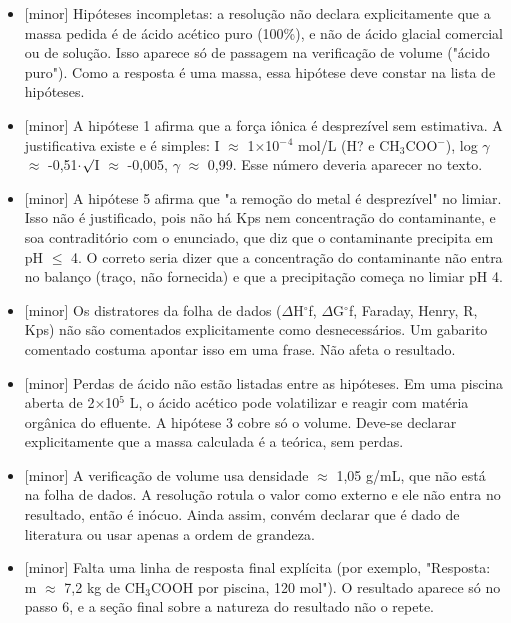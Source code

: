 \documentclass{article}%
\begin{document}
\begin{itemize}%
\item%
{[}minor{]} Hipóteses incompletas: a resolução não declara explicitamente que a massa pedida é de ácido acético puro (100\%), e não de ácido glacial comercial ou de solução. Isso aparece só de passagem na verificação de volume ("ácido puro"). Como a resposta é uma massa, essa hipótese deve constar na lista de hipóteses.%
\item%
{[}minor{]} A hipótese 1 afirma que a força iônica é desprezível sem estimativa. A justificativa existe e é simples: I $\approx$ 1$\times$10$^{-}$$^{4}$ mol/L (H? e CH$_{3}$COO$^{-}$), log $\gamma$ $\approx$ -0,51$\cdot$$\surd$I $\approx$ -0,005, $\gamma$ $\approx$ 0,99. Esse número deveria aparecer no texto.%
\item%
{[}minor{]} A hipótese 5 afirma que "a remoção do metal é desprezível" no limiar. Isso não é justificado, pois não há Kps nem concentração do contaminante, e soa contraditório com o enunciado, que diz que o contaminante precipita em pH $\leq$ 4. O correto seria dizer que a concentração do contaminante não entra no balanço (traço, não fornecida) e que a precipitação começa no limiar pH 4.%
\item%
{[}minor{]} Os distratores da folha de dados ($\Delta$H$^\circ$f, $\Delta$G$^\circ$f, Faraday, Henry, R, Kps) não são comentados explicitamente como desnecessários. Um gabarito comentado costuma apontar isso em uma frase. Não afeta o resultado.%
\item%
{[}minor{]} Perdas de ácido não estão listadas entre as hipóteses. Em uma piscina aberta de 2$\times$10$^{5}$ L, o ácido acético pode volatilizar e reagir com matéria orgânica do efluente. A hipótese 3 cobre só o volume. Deve{-}se declarar explicitamente que a massa calculada é a teórica, sem perdas.%
\item%
{[}minor{]} A verificação de volume usa densidade $\approx$ 1,05 g/mL, que não está na folha de dados. A resolução rotula o valor como externo e ele não entra no resultado, então é inócuo. Ainda assim, convém declarar que é dado de literatura ou usar apenas a ordem de grandeza.%
\item%
{[}minor{]} Falta uma linha de resposta final explícita (por exemplo, "Resposta: m $\approx$ 7,2 kg de CH$_{3}$COOH por piscina, 120 mol"). O resultado aparece só no passo 6, e a seção final sobre a natureza do resultado não o repete.%
\end{itemize}%
\end{document}
